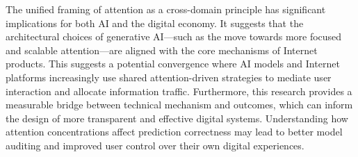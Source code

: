 The unified framing of attention as a cross-domain principle has significant implications for both AI and the digital economy. It suggests that the architectural choices of generative AI—such as the move towards more focused and scalable attention—are aligned with the core mechanisms of Internet products. This suggests a potential convergence where AI models and Internet platforms increasingly use shared attention-driven strategies to mediate user interaction and allocate information traffic. Furthermore, this research provides a measurable bridge between technical mechanism and outcomes, which can inform the design of more transparent and effective digital systems. Understanding how attention concentrations affect prediction correctness may lead to better model auditing and improved user control over their own digital experiences.
